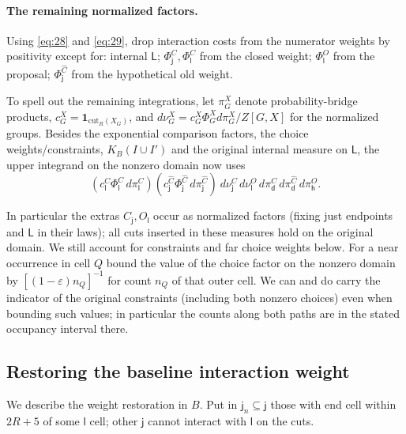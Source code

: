 \paragraph{The remaining normalized factors.}
Using \eqref{eq:28} and \eqref{eq:29}, drop interaction costs from the numerator weights by positivity except for: internal \(\mathsf L\); \(\Phi_{\mathsf j}^C,\Phi_{\mathsf l}^C\) from the closed weight; \(\Phi_{\mathsf l}^O\) from the proposal; \(\Phi_{\mathsf j}^{\widehat C}\) from the hypothetical old weight. 

To spell out the remaining integrations, let \(\pi_G^X\) denote probability-bridge products, \(c_G^X=\mathbf 1_{\mathrm{cut}_R(X_G)}\), and \(d\nu_G^X=c_G^X\Phi_G^X d\pi_G^X/Z[G,X]\) for the normalized groups. Besides the exponential comparison factors, the choice weights/constraints, \(K_B(I\cup I')\) and the original internal measure on \(\mathsf L\), the upper integrand on the nonzero domain now uses
\[
 (c_{\mathsf l}^C\Phi_{\mathsf l}^C\,d\pi_{\mathsf l}^C)
 (c_{\mathsf j}^{\widehat C}\Phi_{\mathsf j}^{\widehat C}\,d\pi_{\mathsf j}^{\widehat C})
 \ d\nu_{\mathsf j}^C\,d\nu_{\mathsf l}^O\,
 d\pi_{\mathsf d}^C\,d\pi_{\mathsf d}^{\widehat C}\,d\pi_{\mathsf h}^O .
\]


In particular the extras \(C_{\mathsf j},O_{\mathsf l}\) occur as normalized factors (fixing just endpoints and \(\mathsf L\) in their laws); all cuts inserted in these measures hold on the original domain. We still account for constraints and far choice weights below. For a near occurrence in cell \(Q\) bound the value of the choice factor on the nonzero domain by \([(1-\varepsilon)n_Q]^{-1}\) for count \(n_Q\) of that outer cell. We can and do carry the indicator of the original constraints (including both nonzero choices) even when bounding such values; in particular the counts along both paths are in the stated occupancy interval there.

\subsection{Restoring the baseline interaction weight}

We describe the weight restoration in \(B\). Put in \(\mathsf j_n\subseteq\mathsf j\) those with end cell within \(2R+5\) of some \(\mathsf l\) cell; other \(\mathsf j\) cannot interact with \(\mathsf l\) on the cuts. 

